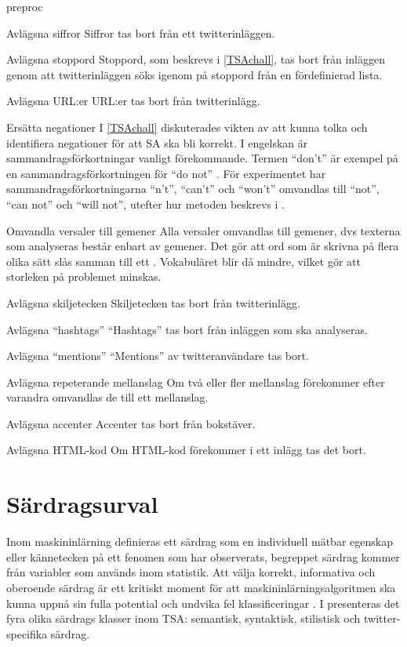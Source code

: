 \documentclass{kaumasters} %
\begin{document}
\begin{labeling}{preproc}
\item [Avlägsna siffror] 
Siffror tas bort från ett twitterinläggen.
\item [Avlägsna stoppord] 
Stoppord, som beskrevs i \ref{TSAchall}, tas bort från inläggen genom att twitterinläggen söks igenom på stoppord från en fördefinierad lista. 
\item[Avlägsna URL:er]
URL:er tas bort från twitterinlägg.
\item[Ersätta negationer]
I \ref{TSAchall} diskuterades vikten av att kunna tolka och identifiera negationer för att SA ska bli korrekt. I engelskan är sammandragsförkortningar vanligt förekommande. Termen “don’t” är exempel på en sammandragsförkortningen för “do not” . För experimentet har sammandragsförkortningarna “n’t”, “can’t” och “won’t” omvandlas till “not”, “can not” och “will not”, utefter hur metoden beskrevs i \cite{7862202}.
\item[Omvandla versaler till gemener]
Alla versaler omvandlas till gemener, dvs texterna som analyseras består enbart av gemener. Det gör att ord som är skrivna på flera olika sätt slås samman till ett \cite{effrosynidis2017comparison}. Vokabuläret blir då mindre, vilket gör att storleken på problemet minskas.  
\item[Avlägsna skiljetecken]
Skiljetecken tas bort från twitterinlägg.
\item[Avlägsna “hashtags”]
“Hashtags” tas bort från inläggen som ska analyseras.
\item[Avlägsna “mentions”]
“Mentions” av twitteranvändare tas bort.
\item[Avlägsna repeterande mellanslag]
Om två eller fler mellanslag förekommer efter varandra omvandlas de till ett mellanslag.
\item[Avlägsna accenter]
Accenter tas bort från bokstäver. 
\item[Avlägsna HTML-kod]
Om HTML-kod förekommer i ett inlägg tas det bort.
\end{labeling}

\section{Särdragsurval} \label{exp:feat}
Inom maskininlärning definieras ett särdrag som en individuell mätbar egenskap eller kännetecken på ett fenomen som har observerats, begreppet särdrag kommer från variabler som används inom statistik. Att välja korrekt, informativa och oberoende särdrag är ett kritiskt moment för att maskininlärningsalgoritmen ska kunna uppnå sin fulla potential och undvika fel klassificeringar \cite{wiki:014}. 
I \cite{TSAsurvey} presenteras det fyra olika särdrags klasser inom TSA: semantisk, syntaktisk, stilistisk och twitter-specifika särdrag.
\end{document}
